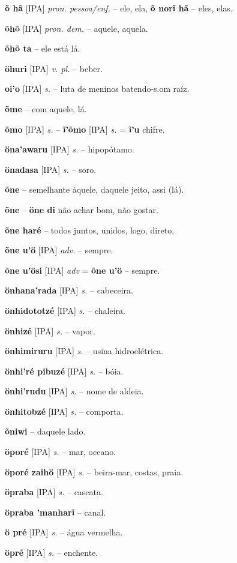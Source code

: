 \textbf{õ hã} [IPA] \textit{pron. pessoa/enf.} -- ele, ela, \textbf{õ norĩ hã} -- eles, elas.

\textbf{õhõ} [IPA] \textit{pron. dem.} -- aquele, aquela.

\textbf{õhõ ta} -- ele está lá.

\textbf{öhuri} [IPA] \textit{v. pl.} -- beber.

\textbf{oi'o} [IPA] \textit{s.} -- luta de meninos batendo-s.om raíz.

\textbf{õme} -- com aquele, lá.

\textbf{õmo} [IPA] \textit{s.} -- \textbf{ĩ'õmo} [IPA] \textit{s.} = \textbf{ĩ'u} chifre.

\textbf{öna'awaru} [IPA] \textit{s.} -- hipopótamo.

\textbf{önadasa} [IPA] \textit{s.} -- soro.

\textbf{õne} -- semelhante àquele, daquele jeito, assi (lá).

\textbf{õne} -- \textbf{öne di} não achar bom, não gostar.

\textbf{õne haré} -- todos juntos, unidos, logo, direto.

\textbf{õne u'ö} [IPA] \textit{adv.} -- sempre.

\textbf{õne u'ösi} [IPA] \textit{adv} = \textbf{õne u'ö} -- sempre.

\textbf{önhana'rada} [IPA] \textit{s.} -- cabeceira.

\textbf{önhidototzé} [IPA] \textit{s.} -- chaleira.

\textbf{önhizé} [IPA] \textit{s.} -- vapor.

\textbf{önhimiruru} [IPA] \textit{s.} -- usina hidroelétrica.

\textbf{önhi'ré pibuzé} [IPA] \textit{s.} -- bóia.

\textbf{önhi'rudu} [IPA] \textit{s.} -- nome de aldeia.

\textbf{önhitobzé} [IPA] \textit{s.} -- comporta.

\textbf{õniwi} -- daquele lado.

\textbf{öporé} [IPA] \textit{s.} -- mar, oceano.

\textbf{öporé zaihö} [IPA] \textit{s.} -- beira-mar, costas, praia.

\textbf{öpraba} [IPA] \textit{s.} -- cascata.

\textbf{öpraba 'manharĩ} -- canal.

\textbf{ö pré} [IPA] \textit{s.} -- água vermelha.

\textbf{öpré} [IPA] \textit{s.} -- enchente.

